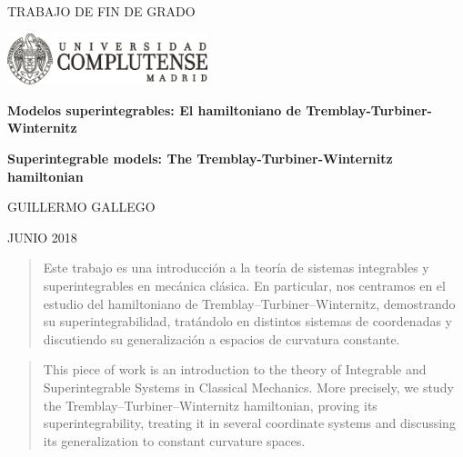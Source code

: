 \documentclass[11pt,a4paper,twoside]{article}
\theoremstyle{definition} \newtheorem{defn}[thm]{Definición}
\theoremstyle{definition} \newtheorem{ejemplo}[thm]{Ejemplo}
\theoremstyle{definition} \newtheorem{ejercicio}[thm]{Ejercicio}
\theoremstyle{remark} \newtheorem*{obs}{Observación}
\begin{document}
\begin{titlepage}
\vspace*{-1cm}
\begin{minipage}{0.5\textwidth}
  \centering
    \Large TRABAJO DE FIN DE GRADO 
  \end{minipage}
\begin{minipage}{0.5\textwidth}
  \centering
\includegraphics[height=1.5cm]{Negro-transparente}
  \end{minipage}

\vspace*{1.5cm}
\begin{center}

\rm \LARGE\bfseries\sffamily Modelos superintegrables: El hamiltoniano de Tremblay-Turbiner-Winternitz

\vspace*{0.5cm}
\rm \large \bfseries\sffamily Superintegrable models: The Tremblay-Turbiner-Winternitz hamiltonian

\vspace*{1cm}
\rm \large 
\sc GUILLERMO GALLEGO

\vspace*{.5 cm}
\sc \normalsize JUNIO 2018 \\
\end{center}

\vspace*{1cm}

\begin{abstract}
  Este trabajo es una introducción a la teoría de sistemas integrables y superintegrables en mecánica clásica. En particular, nos centramos en el estudio del hamiltoniano de Tremblay--Turbiner--Winternitz, demostrando su superintegrabilidad, tratándolo en distintos sistemas de coordenadas y discutiendo su generalización a espacios de curvatura constante.
\end{abstract}
\begin{abstract}
 This piece of work is an introduction to the theory of Integrable and Superintegrable Systems in Classical Mechanics. More precisely, we study the Tremblay--Turbiner--Winternitz hamiltonian, proving its superintegrability, treating it in several coordinate systems and discussing its generalization to constant curvature spaces.
\end{abstract}


\end{titlepage}
\end{document}

